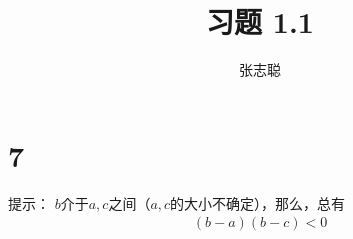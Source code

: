 \documentclass{article}
\begin{document}
\title{习题 1.1}
\author{张志聪}
\maketitle

\section*{7}

提示：
$b$介于$a, c$之间（$a,c$的大小不确定），那么，总有
\begin{align*}
  (b - a) (b - c) < 0
\end{align*}
\end{document}
